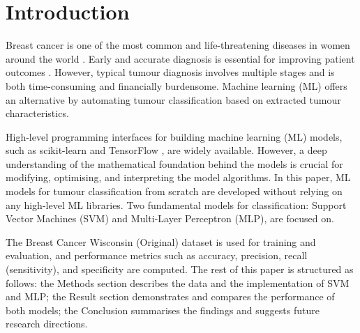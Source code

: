 \section{Introduction}

Breast cancer is one of the most common and life-threatening diseases in women around the world \cite{WHO2024}.  Early and accurate diagnosis is essential for improving patient outcomes \cite{Sun2017}. However, typical tumour diagnosis involves multiple stages \cite{Cardoso2019} and is both time-consuming and financially burdensome. Machine learning (ML) offers an alternative by automating tumour classification based on  extracted tumour characteristics. 

High-level programming interfaces for building machine learning (ML) models, such as scikit-learn \cite{scikit_learn} and TensorFlow \cite{TensorFlow2024}, are widely available. However, a deep understanding of the mathematical foundation behind the models is crucial for modifying, optimising, and interpreting the model algorithms. In this paper, ML models for tumour classification from scratch are developed without relying on any high-level ML libraries. Two fundamental models for classification: Support Vector Machines (SVM) and Multi-Layer Perceptron (MLP), are focused on. 

The Breast Cancer Wisconsin (Original) dataset is used for training and evaluation, and performance metrics such as accuracy, precision, recall (sensitivity), and specificity are computed. The rest of this paper is structured as follows: the Methods section describes the data and the implementation of SVM and MLP; the Result section demonstrates and compares the performance of both models; the Conclusion summarises the findings and suggests future research directions.